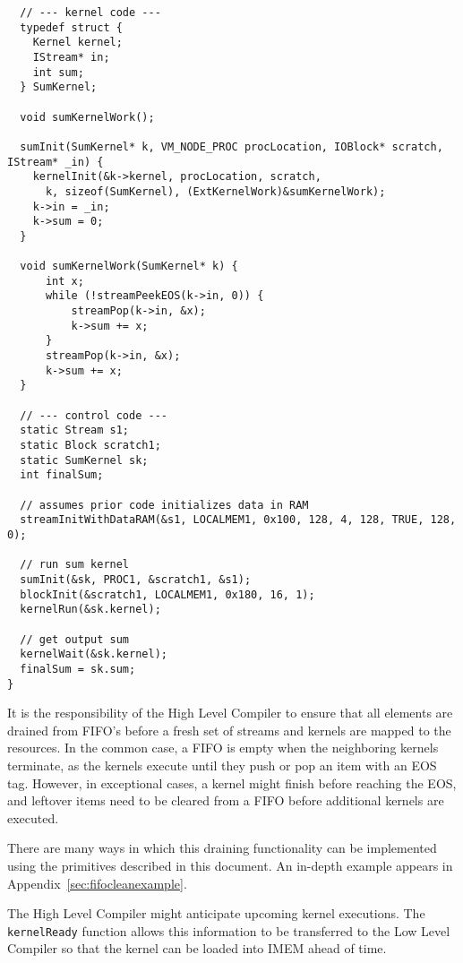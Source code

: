 {\small
\begin{verbatim}
  // --- kernel code ---
  typedef struct {
    Kernel kernel;
    IStream* in;
    int sum;
  } SumKernel;

  void sumKernelWork();
  
  sumInit(SumKernel* k, VM_NODE_PROC procLocation, IOBlock* scratch, IStream* _in) {
    kernelInit(&k->kernel, procLocation, scratch,
      k, sizeof(SumKernel), (ExtKernelWork)&sumKernelWork); 
    k->in = _in;
    k->sum = 0;
  }

  void sumKernelWork(SumKernel* k) {
      int x;
      while (!streamPeekEOS(k->in, 0)) {
          streamPop(k->in, &x);
          k->sum += x;
      }
      streamPop(k->in, &x);
      k->sum += x;
  }

  // --- control code ---
  static Stream s1;
  static Block scratch1;
  static SumKernel sk;
  int finalSum;

  // assumes prior code initializes data in RAM
  streamInitWithDataRAM(&s1, LOCALMEM1, 0x100, 128, 4, 128, TRUE, 128, 0);

  // run sum kernel
  sumInit(&sk, PROC1, &scratch1, &s1);
  blockInit(&scratch1, LOCALMEM1, 0x180, 16, 1);
  kernelRun(&sk.kernel);

  // get output sum
  kernelWait(&sk.kernel);
  finalSum = sk.sum; 
}\end{verbatim}}

\label{sec:fifoclean}

It is the responsibility of the High Level Compiler to ensure that all
elements are drained from FIFO's before a fresh set of streams and
kernels are mapped to the resources.  In the common case, a FIFO is
empty when the neighboring kernels terminate, as the kernels execute
until they push or pop an item with an EOS tag.  However, in
exceptional cases, a kernel might finish before reaching the EOS, and
leftover items need to be cleared from a FIFO before additional
kernels are executed.

There are many ways in which this draining functionality can be
implemented using the primitives described in this document.  An
in-depth example appears in Appendix~\ref{sec:fifocleanexample}.


The High Level Compiler might anticipate upcoming kernel
executions. The {\tt kernelReady} function allows this information to
be transferred to the Low Level Compiler so that the kernel can be
loaded into IMEM ahead of time.


